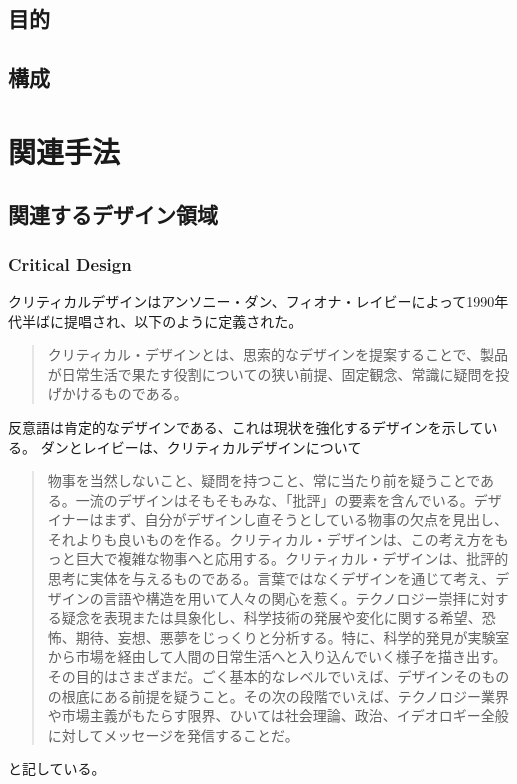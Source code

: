 \documentclass{jsarticle}
\begin{document}
\newpage
\subsection{目的}
\newpage
\subsection{構成}


\newpage
\section{関連手法}
\subsection{関連するデザイン領域}

\subsubsection{Critical Design}
クリティカルデザインはアンソニー・ダン、フィオナ・レイビーによって1990年代半ばに提唱され、以下のように定義された。
\begin{quotation}
  クリティカル・デザインとは、思索的なデザインを提案することで、製品が日常生活で果たす役割についての狭い前提、固定観念、常識に疑問を投げかけるものである。
\end{quotation}
反意語は肯定的なデザインである、これは現状を強化するデザインを示している。
ダンとレイビーは、クリティカルデザインについて
\begin{quotation}
  物事を当然しないこと、疑問を持つこと、常に当たり前を疑うことである。一流のデザインはそもそもみな、「批評」の要素を含んでいる。デザイナーはまず、自分がデザインし直そうとしている物事の欠点を見出し、それよりも良いものを作る。クリティカル・デザインは、この考え方をもっと巨大で複雑な物事へと応用する。クリティカル・デザインは、批評的思考に実体を与えるものである。言葉ではなくデザインを通じて考え、デザインの言語や構造を用いて人々の関心を惹く。テクノロジー崇拝に対する疑念を表現または具象化し、科学技術の発展や変化に関する希望、恐怖、期待、妄想、悪夢をじっくりと分析する。特に、科学的発見が実験室から市場を経由して人間の日常生活へと入り込んでいく様子を描き出す。その目的はさまざまだ。ごく基本的なレベルでいえば、デザインそのものの根底にある前提を疑うこと。その次の段階でいえば、テクノロジー業界や市場主義がもたらす限界、ひいては社会理論、政治、イデオロギー全般に対してメッセージを発信することだ。
\end{quotation}
と記している。
\end{document}
